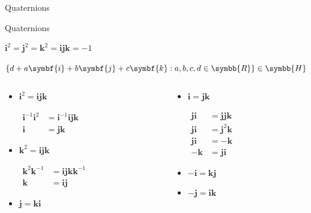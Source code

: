 \documentclass[aspectratio=169,t]{beamer}
\begin{document}
\begin{frame}[label={sec:orga49fadc}]{Quaternions}
\end{frame}

\begin{frame}[label={sec:org7254f52}]{Quaternions}
\begin{definition}[Quaternion]\label{sec:orga9d9bdf}
\(\symbf{i}^2 = \symbf{j}^2 = \symbf{k}^2 = \symbf{ijk} = -1\)

\(\left\{ d + a\symbf{i} + b\symbf{j} + c\symbf{k} : a,b,c,d \in \symbb{R} \right\} \in \symbb{H}\)
\end{definition}

\begin{columns}
\begin{column}{0.50\columnwidth}
\begin{itemize}
\item<2-> \(\symbf{i}^2 = \symbf{ijk}\)

{\centering
$ \displaystyle
\begin{aligned}
  \symbf{i}^{-1} \symbf{i}^2 & = \symbf{i}^{-1} \symbf{ijk} \\
  \symbf{i} & = \symbf{jk}
\end{aligned}
$
\par}
\item<3-> \(\symbf{k}^2 = \symbf{ijk}\)

{\centering
$ \displaystyle
\begin{aligned}
  \symbf{k}^2 \symbf{k}^{-1} & = \symbf{ijk} \symbf{k}^{-1} \\
  \symbf{k} & = \symbf{ij}
\end{aligned}
$
\par}
\item<3-> \(\symbf{j} = \symbf{ki}\)
\end{itemize}
\end{column}

\begin{column}{0.50\columnwidth}
\begin{itemize}
\item<4-> \(\symbf{i} = \symbf{jk}\)

{\centering
$ \displaystyle
\begin{aligned}
  \symbf{ji} & = \symbf{jjk} \\
  \symbf{ji} & = \symbf{j}^2 \symbf{k} \\
  \symbf{ji} & = -\symbf{k} \\
  -\symbf{k} & = \symbf{ji}
\end{aligned}
$
\par}
\item<5-> \(-\symbf{i} = \symbf{kj}\)
\item<5-> \(-\symbf{j} = \symbf{ik}\)
\end{itemize}
\end{column}
\end{columns}
\end{frame}
\end{document}
